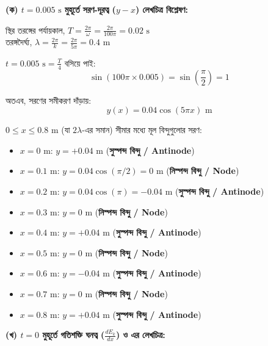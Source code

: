 \documentclass[12pt, a4paper]{article}
\begin{document}
\begin{tcolorbox}[solutionbox={সমাধান (Solution)}]
\noindent
\textbf{(ক) $t = 0.005\text{ s}$ মুহূর্তে সরণ-দূরত্ব ($y-x$) লেখচিত্র বিশ্লেষণ:}

\vspace{0.5em}
\noindent
স্থির তরঙ্গের পর্যায়কাল, $T = \frac{2\pi}{\omega} = \frac{2\pi}{100\pi} = 0.02\text{ s}$ \\
তরঙ্গদৈর্ঘ্য, $\lambda = \frac{2\pi}{k} = \frac{2\pi}{5\pi} = 0.4\text{ m}$

\vspace{0.5em}
\noindent
$t = 0.005\text{ s} = \frac{T}{4}$ বসিয়ে পাই:
\[ \sin(100\pi \times 0.005) = \sin\left(\frac{\pi}{2}\right) = 1 \]

\noindent
অতএব, সরণের সমীকরণ দাঁড়ায়:
\[ y(x) = 0.04 \cos(5\pi x)\text{ m} \]

\vspace{0.3em}
\noindent
$0 \le x \le 0.8\text{ m}$ (যা $2\lambda$-এর সমান) সীমার মধ্যে মূল বিন্দুগুলোর সরণ:
\begin{itemize}[leftmargin=2em, itemsep=0.2em]
    \item $x = 0\text{ m}$: $y = +0.04\text{ m}$ \quad (\textbf{সুস্পন্দ বিন্দু / Antinode})
    \item $x = 0.1\text{ m}$: $y = 0.04 \cos(\pi/2) = 0\text{ m}$ \quad (\textbf{নিস্পন্দ বিন্দু / Node})
    \item $x = 0.2\text{ m}$: $y = 0.04 \cos(\pi) = -0.04\text{ m}$ \quad (\textbf{সুস্পন্দ বিন্দু / Antinode})
    \item $x = 0.3\text{ m}$: $y = 0\text{ m}$ \quad (\textbf{নিস্পন্দ বিন্দু / Node})
    \item $x = 0.4\text{ m}$: $y = +0.04\text{ m}$ \quad (\textbf{সুস্পন্দ বিন্দু / Antinode})
    \item $x = 0.5\text{ m}$: $y = 0\text{ m}$ \quad (\textbf{নিস্পন্দ বিন্দু / Node})
    \item $x = 0.6\text{ m}$: $y = -0.04\text{ m}$ \quad (\textbf{সুস্পন্দ বিন্দু / Antinode})
    \item $x = 0.7\text{ m}$: $y = 0\text{ m}$ \quad (\textbf{নিস্পন্দ বিন্দু / Node})
    \item $x = 0.8\text{ m}$: $y = +0.04\text{ m}$ \quad (\textbf{সুস্পন্দ বিন্দু / Antinode})
\end{itemize}

\vspace{1em}
\noindent
\textbf{(খ) $t = 0$ মুহূর্তে গতিশক্তি ঘনত্ব ($\frac{dE_k}{dx}$) ও এর লেখচিত্র:}


\end{tcolorbox}
\end{document}
